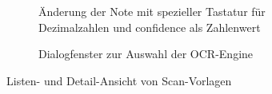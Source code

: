 \documentclass[notables, nomenclature, oneside, 150]{HSMW-Thesis}
\begin{document}
\begin{figure}[h!]
\begin{subfigure}[t]{0.3\textwidth}
        			\caption{Änderung der Note mit spezieller Tastatur für Dezimalzahlen und confidence als Zahlenwert}
        			\label{fig:ocr3}
    			\end{subfigure}
    			\begin{subfigure}[t]{0.3\textwidth}
        			\caption{Dialogfenster zur Auswahl der OCR-Engine}
        			\label{fig:ocr4}
    			\end{subfigure}
    			\caption{Listen- und Detail-Ansicht von Scan-Vorlagen}
				\label{fig:ocr}
			\end{figure}
 
\end{document}
